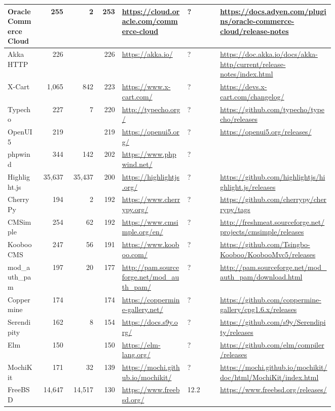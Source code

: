 \begin{landscape}
\begin{longtable}{|p{0.1\linewidth}|r|r|r|p{0.2\linewidth}|p{0.1\linewidth}|p{0.35\linewidth}|}
		Oracle Commerce Cloud &255 &2 &253 &\url{https://cloud.oracle.com/commerce-cloud} &? &\url{https://docs.adyen.com/plugins/oracle-commerce-cloud/release-notes} \\\hline
		Akka HTTP &226 & &226 &\url{https://akka.io/} &? &\url{https://doc.akka.io/docs/akka-http/current/release-notes/index.html} \\\hline
		X-Cart &1,065 &842 &223 &\url{https://www.x-cart.com/} &? &\url{https://devs.x-cart.com/changelog/} \\\hline
		Typecho &227 &7 &220 &\url{http://typecho.org/} &? &\url{https://github.com/typecho/typecho/releases} \\\hline
		OpenUI5 &219 & &219 &\url{https://openui5.org/} &? &\url{https://openui5.org/releases/} \\\hline
		phpwind &344 &142 &202 &\url{https://www.phpwind.net/} &? & \\\hline
		Highlight.js &35,637 &35,437 &200 &\url{https://highlightjs.org/} &? &\url{https://github.com/highlightjs/highlight.js/releases} \\\hline
		CherryPy &194 &2 &192 &\url{https://www.cherrypy.org/} &? &\url{https://github.com/cherrypy/cherrypy/tags} \\\hline
		CMSimple &254 &62 &192 &\url{https://www.cmsimple.org/en/} &? &\url{http://freshmeat.sourceforge.net/projects/cmsimple/releases} \\\hline
		Kooboo CMS &247 &56 &191 &\url{https://www.kooboo.com/} &? &\url{https://github.com/Tsingbo-Kooboo/KoobooMvc5/releases} \\\hline
		mod\_auth\_pam &197 &20 &177 &\url{http://pam.sourceforge.net/mod\_auth\_pam/} &? &\url{http://pam.sourceforge.net/mod\_auth\_pam/download.html} \\\hline
		Coppermine &174 & &174 &\url{https://coppermine-gallery.net/} &? &\url{https://github.com/coppermine-gallery/cpg1.6.x/releases} \\\hline
		Serendipity &162 &8 &154 &\url{https://docs.s9y.org/} &? &\url{https://github.com/s9y/Serendipity/releases} \\\hline
		Elm &150 & &150 &\url{https://elm-lang.org/} &? &\url{https://github.com/elm/compiler/releases} \\\hline
		MochiKit &171 &32 &139 &\url{https://mochi.github.io/mochikit/} &? &\url{https://mochi.github.io/mochikit/doc/html/MochiKit/index.html} \\\hline
		FreeBSD &14,647 &14,517 &130 &\url{https://www.freebsd.org/} &12.2 &\url{https://www.freebsd.org/releases/} \\\hline

\end{longtable}
\end{landscape}
